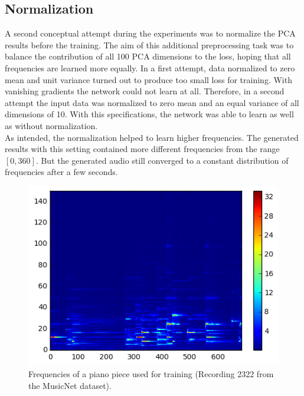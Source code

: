 \documentclass[10pt,conference,compsocconf]{IEEEtran}
\begin{document}
\subsection{Normalization}
A second conceptual attempt during the experiments was to normalize the PCA results before the training. The aim of this additional preprocessing task was to balance the contribution of all 100 PCA dimensions to the loss, hoping that all frequencies are learned more equally. In a first attempt, data normalized to zero mean and unit variance turned out to produce too small loss for training. With vanishing gradients the network could not learn at all. Therefore, in a second attempt the input data was normalized to zero mean and an equal variance of all dimensions of 10. With this specifications, the network was able to learn as well as without normalization.\\
As intended, the normalization helped to learn higher frequencies. The generated results with this setting contained more different frequencies from the range $[0,360]$. But the generated audio still converged to a constant distribution of frequencies after a few seconds. 
\begin{figure}[tbp]
  \centering
  \includegraphics[width=\columnwidth]{figures/original_frequencies.png}
  \caption{Frequencies of a piano piece used for training (Recording 2322 from the MusicNet dataset). }
  \label{fig:original_frequencies}
\end{figure}
\end{document}
